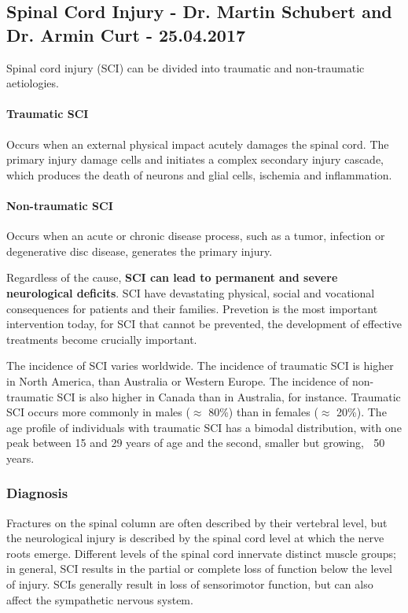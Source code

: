 \documentclass[12pt,article,oneside,a4paper]{memoir}
\begin{document}
\newpage
\subsection{Spinal Cord Injury - Dr. Martin Schubert and Dr. Armin Curt - 25.04.2017}

Spinal cord injury (SCI) can be divided into traumatic and non-traumatic aetiologies. 

\paragraph{Traumatic SCI}
Occurs when an external physical impact acutely damages the spinal cord. The primary injury damage cells and initiates a complex secondary injury cascade, which produces the death of neurons and glial cells, ischemia and inflammation.

\paragraph{Non-traumatic SCI}
Occurs when an acute or chronic disease process, such as a tumor, infection or degenerative disc disease, generates the primary injury.

Regardless of the cause, \textbf{SCI can lead to permanent and severe neurological deficits}. SCI have devastating physical, social and vocational consequences for patients and their families. Prevetion is the most important intervention today, for SCI that cannot be prevented, the development of effective treatments become crucially important.

The incidence of SCI varies worldwide. The incidence of traumatic SCI is higher in North America, than Australia or Western Europe. The incidence of non-traumatic SCI is also higher in Canada than in Australia, for instance.
Traumatic SCI occurs more commonly in males ($\approx$ 80\%) than in females ($\approx$ 20\%). The age profile of individuals with traumatic SCI has a bimodal distribution, with one peak between 15 and 29 years of age and the second, smaller but growing, $\>$ 50 years.

\subsubsection{Diagnosis}
Fractures on the spinal column are often described by their vertebral level, but the neurological injury is described by the spinal cord level at which the nerve roots emerge. Different levels of the spinal cord innervate distinct muscle groups; in general, SCI results in the partial or complete loss of function below the level of injury. SCIs generally result in loss of sensorimotor function, but can also affect the sympathetic nervous system.
\end{document}
